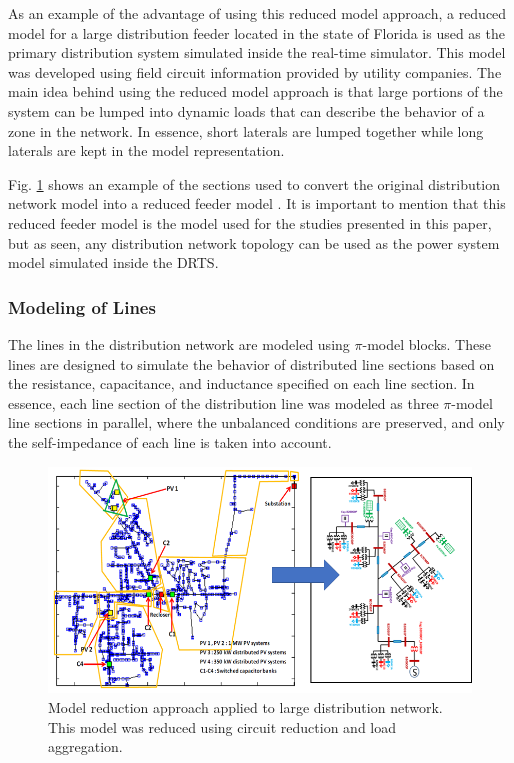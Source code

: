 As an example of the advantage of using this reduced model approach, a reduced model for a large distribution feeder located in the state of Florida is used as the primary distribution system simulated inside the real-time simulator. This model was developed using field circuit information provided by utility companies. The main idea behind using the reduced model approach is that large portions of the system can be lumped into dynamic loads that can describe the behavior of a zone in the network. In essence, short laterals are lumped together while long laterals are kept in the model representation.

Fig. \ref{fig:modelreduction} shows an example of the sections used to convert the original distribution network model into a reduced feeder model \cite{sungrin}. It is important to mention that this reduced feeder model is the model used for the studies presented in this paper, but as seen, any distribution network topology can be used as the power system model simulated inside the DRTS.

\subsubsection{Modeling of Lines} The lines in the distribution network are modeled using $\pi$-model blocks. These lines are designed to simulate the behavior of distributed line sections based on the resistance, capacitance, and inductance specified on each line section. In essence, each line section of the distribution line was modeled as three $\pi$-model line sections in parallel, where the unbalanced conditions are preserved, and only the self-impedance of each line is taken into account. 

\begin{figure}[!ht]
    \centering
    \includegraphics[width = \linewidth]{figs/model_reduction.png}
    \caption{Model reduction approach applied to large distribution network. This model was reduced using circuit reduction and load aggregation.}
    \label{fig:modelreduction}
\end{figure}
\vspace{-5mm}
